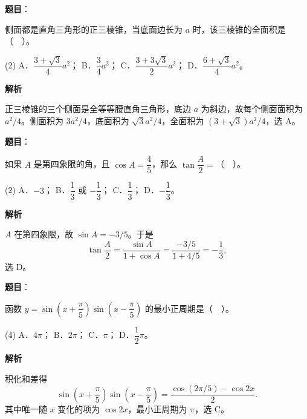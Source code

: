 \begin{answer}

\textbf{题目}：

侧面都是直角三角形的正三棱锥，当底面边长为 $a$ 时，该三棱锥的全面积是（　）。

\begin{gkopts}(2)
\task A．$\dfrac{3+\sqrt3}{4}a^2$；
\task B．$\dfrac34a^2$；
\task C．$\dfrac{3+3\sqrt3}{2}a^2$；
\task D．$\dfrac{6+\sqrt3}{4}a^2$。
\end{gkopts}

\textbf{解析}

正三棱锥的三个侧面是全等等腰直角三角形，底边 $a$ 为斜边，故每个侧面面积为 $a^2/4$。侧面积为 $3a^2/4$，底面积为 $\sqrt3a^2/4$，全面积为 $(3+\sqrt3)a^2/4$，选 A。


\end{answer}
\begin{answer}

\textbf{题目}：

如果 $A$ 是第四象限的角，且 $\cos A=\dfrac45$，那么 $\tan\dfrac A2=$（　）。

\begin{gkopts}(2)
\task A．$-3$；
\task B．$\dfrac13$ 或 $-\dfrac13$；
\task C．$\dfrac13$；
\task D．$-\dfrac13$。
\end{gkopts}

\textbf{解析}

$A$ 在第四象限，故 $\sin A=-3/5$。于是
\nopagebreak[4]
\[
\tan\frac A2=\frac{\sin A}{1+\cos A}
=\frac{-3/5}{1+4/5}=-\frac13,
\]
选 D。


\end{answer}
\begin{answer}

\textbf{题目}：

函数 $y=\sin\left(x+\dfrac\pi5\right)\sin\left(x-\dfrac\pi5\right)$ 的最小正周期是（　）。

\begin{gkopts}(4)
\task A．$4\pi$；
\task B．$2\pi$；
\task C．$\pi$；
\task D．$\dfrac12\pi$。
\end{gkopts}

\textbf{解析}

积化和差得
\nopagebreak[4]
\[
\sin\left(x+\frac\pi5\right)\sin\left(x-\frac\pi5\right)
=\frac{\cos(2\pi/5)-\cos2x}{2}.
\]
其中唯一随 $x$ 变化的项为 $\cos2x$，最小正周期为 $\pi$，选 C。


\end{answer}
